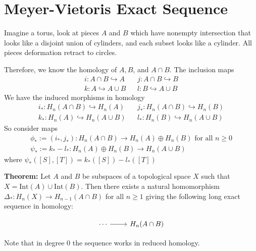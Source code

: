 \documentclass{article}
\begin{document}
\section{Meyer-Vietoris Exact Sequence}
Imagine a torus, look at pieces $A$ and $B$ which have nonempty intersection that looks like a disjoint union of cylinders, and each subset looks like a cylinder. All pieces deformation retract to circles.

Therefore, we know the homology of $A, B$, and $A \cap B$. The inclusion maps
\begin{align*}
i: A \cap B \hookrightarrow A & &
j: A \cap B \hookrightarrow B \\
k: A \hookrightarrow A \cup B & & 
l: B \hookrightarrow A \cup B 
\end{align*}
We have the induced morphisms in homology
\begin{align*}
i_*: H_n(A \cap B) \hookrightarrow H_n(A) & &
j_*: H_n(A \cap B) \hookrightarrow H_n(B) \\
k_*: H_n(A) \hookrightarrow H_n(A \cup B) & & 
l_*: H_n(B) \hookrightarrow H_n(A \cup B)
\end{align*}
So consider maps
\begin{align*}
\phi_* := (i_*, j_*): H_n(A \cap B) \to H_n(A) \oplus H_n(B) \text{ for all } n \geq 0 \\
\psi_* := k_* - l_*: H_n(A) \oplus H_n(B) \to H_n(A \cup B)
\end{align*}
where $\psi_*([S],[T]) = k_*([S]) - l_*([T])$

\textbf{Theorem:} Let $A$ and $B$ be subspaces of a topological space $X$ such that $X = \text{Int}(A) \cup \text{Int}(B)$. Then there exists a natural homomorphism $\Delta_*:H_n(X) \to H_{n-1}(A \cap B)$ for all $n \geq 1$ giving the following long exact sequence in homology:

\[
\begin{tikzcd}
\cdots \arrow[r] & H_n(A \cap B)
\end{tikzcd}
\]

%
Note that in degree 0 the sequence works in reduced homology.
\end{document}
